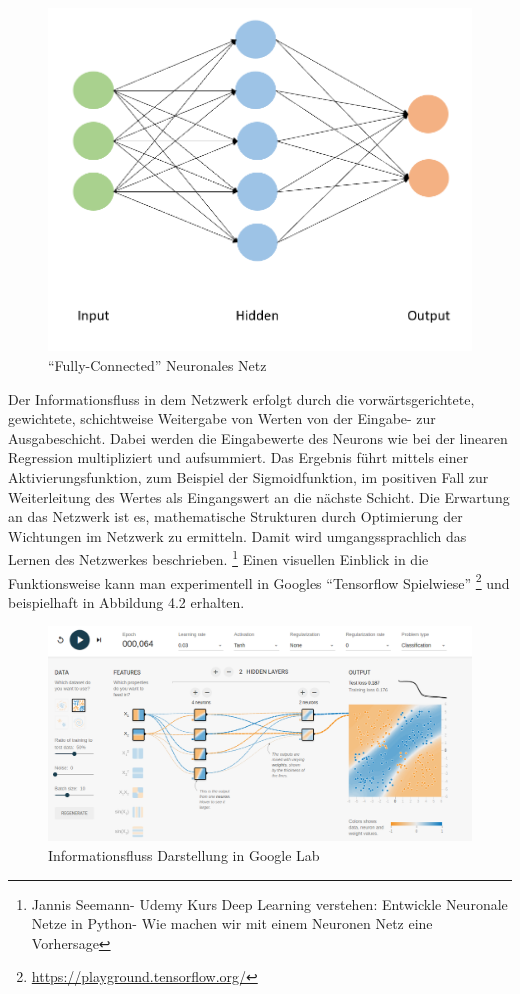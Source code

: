 \documentclass[a4paper]{scrreprt}
\begin{document}
%
\begin{figure}[h!]
\centering
\includegraphics[scale=.65]{Abbildungen/Neuronale_Netze_00}
\caption{``Fully-Connected'' Neuronales Netz}
\label{figure}
\end{figure}
\newpage
Der Informationsfluss in dem Netzwerk erfolgt durch die vorwärtsgerichtete, gewichtete, schichtweise Weitergabe von Werten von der Eingabe- zur Ausgabeschicht. Dabei werden die Eingabewerte des Neurons wie bei der linearen Regression multipliziert und aufsummiert. Das Ergebnis führt mittels einer Aktivierungsfunktion, zum Beispiel der Sigmoidfunktion, im positiven Fall zur Weiterleitung des Wertes als Eingangswert an die nächste Schicht. Die Erwartung an das Netzwerk ist es, mathematische Strukturen durch Optimierung der Wichtungen im Netzwerk zu ermitteln. Damit wird umgangssprachlich das Lernen des Netzwerkes beschrieben.
\footnote{Jannis Seemann- Udemy Kurs Deep Learning verstehen: Entwickle Neuronale Netze in  Python- Wie machen wir mit einem Neuronen Netz eine Vorhersage}
Einen visuellen Einblick in die Funktionsweise kann man experimentell in Googles ``Tensorflow Spielwiese''
\footnote{\url{https://playground.tensorflow.org/}}
 und beispielhaft in Abbildung 4.2 erhalten.
%
\begin{figure}[h!]
\centering
\includegraphics[scale=.3]{Abbildungen/Neuronale_Netze_1}
\caption{Informationsfluss Darstellung in Google Lab}
\label{figure}
\end{figure}
\end{document}
